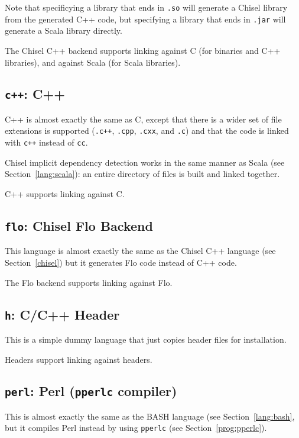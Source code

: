 \documentclass{article}
\begin{document}
Note that specificying a library that ends in \texttt{.so} will
generate a Chisel library from the generated C++ code, but specifying
a library that ends in \texttt{.jar} will generate a Scala library
directly.

The Chisel C++ backend supports linking against C (for binaries and
C++ libraries), and against Scala (for Scala libraries).

\subsection{\texttt{c++}: C++}

C++ is almost exactly the same as C, except that there is a wider set
of file extensions is supported (\texttt{.c++}, \texttt{.cpp},
\texttt{.cxx}, and \texttt{.c}) and that the code is linked with
\texttt{c++} instead of \texttt{cc}.

Chisel implicit dependency detection works in the same manner as Scala
(see Section~\ref{lang:scala}): an entire directory of files is built
and linked together.

C++ supports linking against C.

\subsection{\texttt{flo}: Chisel Flo Backend}

This language is almost exactly the same as the Chisel C++ language
(see Section~\ref{chisel}) but it generates Flo code instead of C++
code.

The Flo backend supports linking against Flo.

\subsection{\texttt{h}: C/C++ Header}

This is a simple dummy language that just copies header files for
installation.

Headers support linking against headers.

\subsection{\texttt{perl}: Perl (\texttt{pperlc} compiler)}

This is almost exactly the same as the BASH language (see
Section~\ref{lang:bash}, but it compiles Perl instead by using
\texttt{pperlc} (see Section~\ref{prog:pperlc}).
\end{document}
